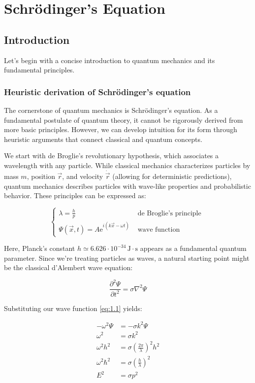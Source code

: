 \chapter{Schrödinger's Equation}

\section{Introduction}
Let's begin with a concise introduction to quantum mechanics and its fundamental principles.

\subsection{Heuristic derivation of Schrödinger's equation}
The cornerstone of quantum mechanics is Schrödinger's equation. As a fundamental postulate of quantum theory, it cannot be rigorously derived from more basic principles. However, we can develop intuition for its form through heuristic arguments that connect classical and quantum concepts.

We start with de Broglie's revolutionary hypothesis, which associates a wavelength with any particle. While classical mechanics characterizes particles by mass $m$, position $\vec{r}$, and velocity $\dot{\vec{r}}$ (allowing for deterministic predictions), quantum mechanics describes particles with wave-like properties and probabilistic behavior. These principles can be expressed as:

\[
\begin{cases}\lambda=\frac{h}{p} & \text { de Broglie's principle }  \label{eq:1.1}\\ \Psi(\vec{x}, t)=A \mathrm{e}^{i(k \vec{x}-\omega t)} & \text { wave function }\end{cases}
\]

Here, Planck's constant $h \simeq 6.626 \cdot 10^{-34} \, \mathrm{J} \cdot \mathrm{s}$ appears as a fundamental quantum parameter. Since we're treating particles as waves, a natural starting point might be the classical d'Alembert wave equation:

\begin{equation}
\frac{\partial^{2} \Psi}{\partial t^{2}}=\sigma \nabla^{2} \Psi
\end{equation}

Substituting our wave function \eqref{eq:1.1} yields:

\begin{align}
-\omega^{2} \Psi & =-\sigma k^{2} \Psi \\
\omega^{2} & =\sigma k^{2} \\
\omega^{2} h^{2} & =\sigma\left(\frac{2 \pi}{\lambda}\right)^{2} h^{2}  \\
\omega^{2} \hbar^{2} & =\sigma\left(\frac{h}{\lambda}\right)^{2} \\
E^{2} & =\sigma p^{2}
\end{align}



